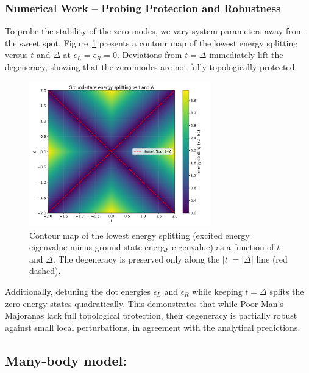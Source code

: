 \documentclass[11pt, letterpaper, titlepage]{article}
\begin{document}
\subsubsection{Numerical Work – Probing Protection and Robustness}

To probe the stability of the zero modes, we vary system parameters away from the sweet spot. Figure~\ref{fig:sb_grid} presents a contour map of the lowest energy splitting versus $t$ and $\Delta$ at $\epsilon_L = \epsilon_R = 0$. Deviations from $t = \Delta$ immediately lift the degeneracy, showing that the zero modes are not fully topologically protected.

\begin{figure}[htbp]
  \centering
  \includegraphics[width=0.7\textwidth]{../Figures/singlebody_sweetspot_grid.png}
  \caption{Contour map of the lowest energy splitting (excited energy eigenvalue minus ground state energy eigenvalue) as a function of $t$ and $\Delta$. The degeneracy is preserved only along the $|t| = |\Delta|$ line (red dashed).}
  \label{fig:sb_grid}
\end{figure}

Additionally, detuning the dot energies $\epsilon_L$ and $\epsilon_R$ while keeping $t = \Delta$ splits the zero-energy states quadratically. This demonstrates that while Poor Man’s Majoranas lack full topological protection, their degeneracy is partially robust against small local perturbations, in agreement with the analytical predictions.
\newpage
\subsection{Many-body model:}
\end{document}
